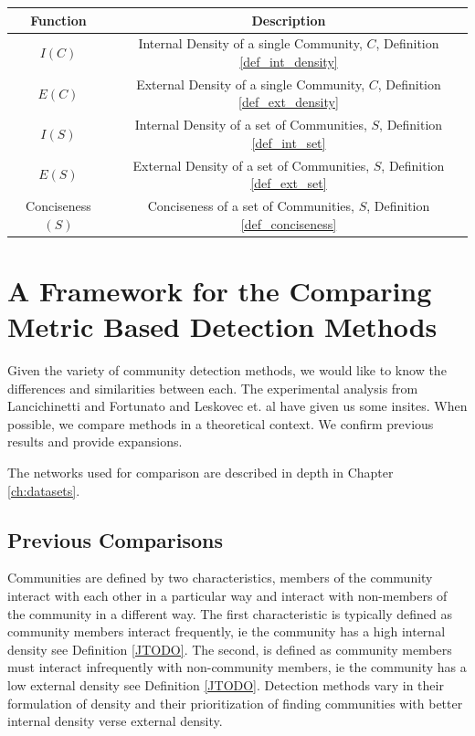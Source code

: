 \documentclass[phd,tocprelim]{cornell}
\renewcommand{\caption}[1]{\singlespacing\hangcaption{#1}\normalspacing}
\begin{document}
\begin{table}
\caption{Introduced Functions}
\begin{center}
\begin{tabular}{|c|c|} \hline
Function & Description \\ \hline
$I(C)$ & Internal Density of a single Community, $C$, Definition \ref{def_int_density} \\ \hline
$E(C)$ & External Density of a single Community, $C$, Definition  \ref{def_ext_density} \\ \hline
$I(S)$ & Internal Density of a set of Communities, $S$, Definition \ref{def_int_set} \\ \hline
$E(S)$ & External Density of a set of Communities, $S$, Definition \ref{def_ext_set} \\ \hline
{\sc Conciseness}$(S)$ & Conciseness of a set of Communities, $S$, Definition \ref{def_conciseness} \\ \hline
\end{tabular}
\end{center}
\label{table_new_functions}
\end{table}

\chapter{A Framework for the Comparing Metric Based Detection Methods}

Given the variety of community detection methods, we would like to know the differences and similarities between each.  The experimental analysis from Lancichinetti and Fortunato \cite{lanc:2009} and Leskovec et. al \cite{leskovec} have given us some insites.  When possible, we compare methods in a theoretical context.  We confirm previous results and provide expansions.

The networks used for comparison are described in depth in Chapter \ref{ch:datasets}.


\section{Previous Comparisons}

Communities are defined by two characteristics, members of the community interact with each other in a particular way and interact with non-members of the community in a different way. The first characteristic is typically defined as community members interact frequently, ie the community has a high internal density see Definition \ref{JTODO}.  The second, is defined as community members must interact infrequently with non-community members, ie the community has a low external density see Definition \ref{JTODO}.  Detection methods vary in their formulation of density and their prioritization of finding communities with better internal density verse external density.
\end{document}
